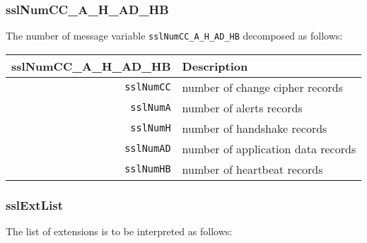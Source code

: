 \documentclass[documentation]{subfiles}
\begin{document}
\subsubsection{sslNumCC\_A\_H\_AD\_HB}\label{sslNumRec}
The number of message variable {\tt sslNumCC\_A\_H\_AD\_HB} decomposed as follows:
\begin{longtable}{rl}
    \toprule
    {\bf sslNumCC\_A\_H\_AD\_HB} & {\bf Description} \\
    \midrule\endhead%
    {\tt sslNumCC} & number of change cipher records\\
    {\tt sslNumA}  & number of alerts records\\
    {\tt sslNumH}  & number of handshake records\\
    {\tt sslNumAD} & number of application data records\\
    {\tt sslNumHB} & number of heartbeat records\\
    \bottomrule
\end{longtable}

\subsubsection{sslExtList}\label{sslExtList}
The list of extensions is to be interpreted as follows:
\end{document}
